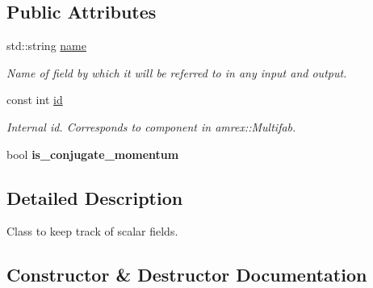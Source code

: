 \subsection*{Public Attributes}
\begin{DoxyCompactItemize}
\item 
\mbox{\label{classsledgehamr_1_1ScalarField_aced45432f3745af8676420de16d85858}} 
std\+::string \mbox{\hyperlink{classsledgehamr_1_1ScalarField_aced45432f3745af8676420de16d85858}{name}}
\begin{DoxyCompactList}\small\item\em Name of field by which it will be referred to in any input and output. \end{DoxyCompactList}\item 
\mbox{\label{classsledgehamr_1_1ScalarField_a633efe8b5d6d2af646a323fd7ac26d14}} 
const int \mbox{\hyperlink{classsledgehamr_1_1ScalarField_a633efe8b5d6d2af646a323fd7ac26d14}{id}}
\begin{DoxyCompactList}\small\item\em Internal id. Corresponds to component in amrex\+::\+Multifab. \end{DoxyCompactList}\item 
\mbox{\label{classsledgehamr_1_1ScalarField_ac1315cb5d5e098799b4c4d9788f5d8eb}} 
bool {\bfseries is\+\_\+conjugate\+\_\+momentum}
\end{DoxyCompactItemize}


\subsection{Detailed Description}
Class to keep track of scalar fields. 

\subsection{Constructor \& Destructor Documentation}
\mbox{\label{classsledgehamr_1_1ScalarField_a3861e15fde648101e465c97aec2050cb}} 
